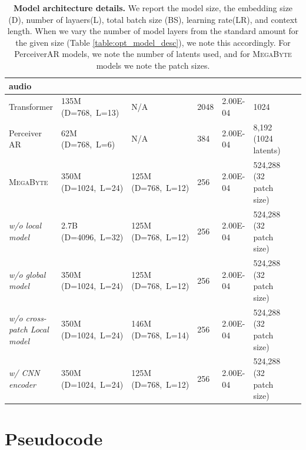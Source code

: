 \documentclass{article}
\newcommand{\fastslow}[0]{\textsc{MegaByte}\xspace}
\newcommand{\megabyte}[0]{\fastslow}
\theoremstyle{plain}
\theoremstyle{definition}
\theoremstyle{remark}
\begin{document}
\begin{table}[h]
\begin{tabular}{llllllll}
\midrule
audio \\
\midrule
Transformer & 135M (D=768,~L=13)  & N/A & 2048  & 2.00E-04 & 1024  \\
Perceiver AR  & 62M (D=768,~L=6) & N/A & 384  & 2.00E-04 & 8,192 (1024 latents) \\
\megabyte  &  350M (D=1024,~L=24) & 125M (D=768,~L=12)  & 256  & 2.00E-04 & 524,288 (32 patch size) \\
\hspace{5pt} \textit{w/o local model} & 2.7B (D=4096,~L=32)  &  125M (D=768,~L=12)  & 256  & 2.00E-04 & 524,288 (32 patch size) \\
\hspace{5pt} \textit{w/o global model}  & 350M (D=1024,~L=24)  &  125M (D=768,~L=12)  & 256  & 2.00E-04 & 524,288 (32 patch size) \\
\hspace{5pt} \textit{w/o cross-patch Local model}  & 350M (D=1024,~L=24) & 146M (D=768,~L=14)  & 256  & 2.00E-04 & 524,288 (32 patch size) \\
\hspace{5pt} \textit{w/ CNN encoder}  & 350M (D=1024,~L=24) & 125M (D=768,~L=12) & 256  & 2.00E-04 & 524,288 (32 patch size) \\
\bottomrule
\end{tabular}
\caption{\textbf{Model architecture details.} We report the model size, the embedding size (D), number of layaers(L), total batch size (BS), learning rate(LR), and context length. When we vary the number of model layers from the standard amount for the given size (Table \ref{table:opt_model_desc}), we note this accordingly. For PerceiverAR models, we note the number of latents used, and for \megabyte models we note the patch sizes.}

\label{tab:model_details}
\end{table}

\section{Pseudocode}
\end{document}
